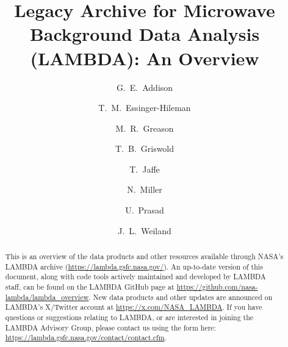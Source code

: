 \documentclass[twocolumn,tighten]{aastex631}
\begin{document}
\title{Legacy Archive for Microwave Background Data Analysis (LAMBDA): An Overview}

\author{G.~E.~Addison}

\author{T.~M.~Essinger-Hileman}

\author{M.~R.~Greason}

\author{T.~B.~Griswold}

\author{T.~Jaffe}

\author{N.~Miller}

\author{U.~Prasad}

\author{J.~L.~Weiland}

\begin{abstract}

\noindent
This is an overview of the data products and other resources available through NASA's LAMBDA archive (\href{https://lambda.gsfc.nasa.gov/}{https://lambda.gsfc.nasa.gov/}). An up-to-date version of this document, along with code tools actively maintained and developed by LAMBDA staff, can be found on the LAMBDA GitHub page at \href{https://github.com/nasa-lambda/lambda_overview}{https://github.com/nasa-lambda/lambda\_overview}. New data products and other updates are announced on LAMBDA's X/Twitter account at \href{https://x.com/NASA_LAMBDA}{https://x.com/NASA\_LAMBDA}. If you have questions or suggestions relating to LAMBDA, or are interested in joining the LAMBDA Advisory Group, please contact us using the form here: \href{https://lambda.gsfc.nasa.gov/contact/contact.cfm}{https://lambda.gsfc.nasa.gov/contact/contact.cfm}.

\end{abstract}
\end{document}
